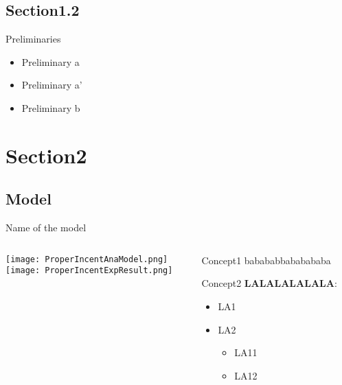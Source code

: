 \documentclass[compress]{beamer}
\begin{document}
\subsection{Section1.2}
\begin{frame}{Preliminaries}
    \begin{itemize}
        \item<1-> Preliminary a
        \item<1-> Preliminary a'
        \item<2-> Preliminary b
    \end{itemize}
\end{frame}

\section{Section2}
\subsection{Model}
\begin{frame}{Name of the model\cite{zhou2022costly}}
    \begin{columns}[c]
    
        \begin{column}{.5\textwidth}
            \centering
            \texttt{[image: ProperIncentAnaModel.png]}\\[0.5cm]
            \texttt{[image: ProperIncentExpResult.png]}\\[0.5cm]
        \end{column}
    
        \begin{column}{.5\textwidth}
            \raggedright
            \begin{minipage}{5.8cm}
                \begin{block}{Concept1}
                    babababbababababa
                \end{block}
                \begin{block}{Concept2}
                    \textbf{LALALALALALA}:\\
                    \begin{itemize}
                        \item LA1
                        \item LA2
                        \begin{itemize}
                        	\item LA11
                        	\item LA12
                        \end{itemize}
                    \end{itemize}
                \end{block}
            \end{minipage}
        \end{column}
    \end{columns}
\end{frame}

\begin{frame}
	\printbibliography
\end{frame}

\begin{frame}
    \titlepage
\end{frame}
\end{document}
